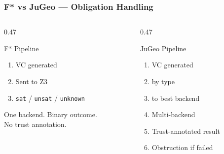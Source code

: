 \begin{frame}
\frametitle{F* vs JuGeo — Obligation Handling}
\begin{columns}[T]
\begin{column}{0.47\textwidth}
\begin{alertblock}{F* Pipeline}
  \begin{enumerate}
    \item VC generated
    \item Sent to Z3
    \item \texttt{sat} / \texttt{unsat} / \texttt{unknown}
  \end{enumerate}
  \vspace{4pt}
  {\small One backend. Binary outcome.\\No trust annotation.}
\end{alertblock}
\end{column}
\begin{column}{0.47\textwidth}
\begin{exampleblock}{JuGeo Pipeline}
  \begin{enumerate}
    \item VC generated
    \item {} by type
    \item {} to best backend
    \item Multi-backend 
    \item Trust-annotated result
    \item Obstruction if failed
  \end{enumerate}
\end{exampleblock}
\end{column}
\end{columns}
\vspace{6pt}
\begin{center}
\end{center}
\end{frame}

